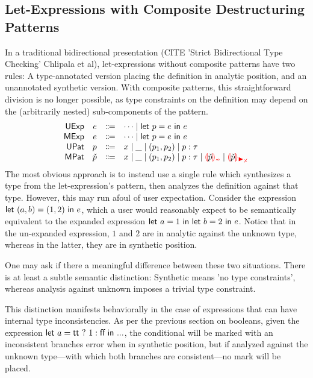 \subsection{Let-Expressions with Composite Destructuring Patterns}
\label{sec:calculus-let}


In a traditional bidirectional presentation (CITE 'Strict Bidirectional Type Checking' Chlipala et al), let-expressions without composite patterns have two rules: A type-annotated version placing the definition in analytic position, and an unannotated synthetic version. With composite patterns, this straightforward division is no longer possible, as type constraints on the definition may depend on the (arbitrarily nested) sub-components of the pattern.
%
\[\begin{array}{rrcl}
  \EMName & \EMV & \Coloneqq & \cdots
                               \mid \ELet{\PMV}{\EMV}{\EMV} \\
  \ECMName & \EMV & \Coloneqq & \cdots
                               \mid \ELet{\PMV}{\EMV}{\EMV} \\
  \PMName & \PMV & \Coloneqq & x 
                               \mid \_
                               \mid (p_1, p_2)
                               \mid p : \TMV \\
  \PCMName & \PCMV & \Coloneqq & x 
                               \mid \_
                               \mid (p_1, p_2)
                               \mid p : \TMV
                               \mid \ECInconType{\PCMV}
                               \mid \ECInconMatchedPair{\PCMV}
\end{array}\]
%
The most obvious approach is to instead use a single rule which synthesizes a type from the let-expression's pattern, then analyzes the definition against that type. However, this may run afoul of user expectation. Consider the expression $\textsf{let}~ (a,b) = (1,2) ~\textsf{in}~ e$, which a user would reasonably expect to be semantically equivalent to the expanded expression $\textsf{let}~ a = 1 ~\textsf{in}~ \textsf{let}~ b = 2 ~\textsf{in}~ e$. Notice that in the un-expanded expression, $1$ and $2$ are in analytic against the unknown type, whereas in the latter, they are in synthetic position.

One may ask if there a meaningful difference between these two situations. There is at least a subtle semantic distinction: Synthetic means 'no type constraints', whereas analysis against unknown imposes a trivial type constraint.

This distinction manifests behaviorally in the case of expressions that can have internal type inconsistencies. As per the previous section on booleans, given the expression $\textsf{let}~ a = {\normalfont\textsf{tt}} ~?~ 1 : {\normalfont\textsf{ff}} ~\textsf{in}~ ...$, the conditional will be marked with an inconsistent branches error when in synthetic position, but if analyzed against the unknown type---with which both branches are consistent---no mark will be placed.

